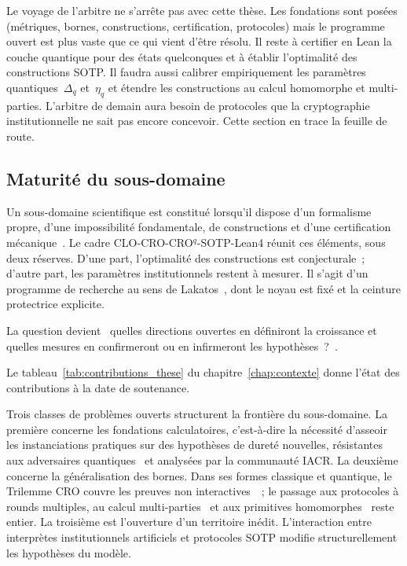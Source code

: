 \begin{boiteArbitre}
Le voyage de l'arbitre ne s'arr\^ete pas avec cette th\`ese. Les fondations
sont pos\'ees (m\'etriques, bornes, constructions, certification,
protocoles) mais le programme ouvert est plus vaste que ce qui vient
d'\^etre r\'esolu. Il reste \`a certifier en Lean la couche quantique pour des \'etats quelconques
et \`a \'etablir l'optimalit\'e des constructions SOTP. Il faudra aussi calibrer empiriquement les param\`etres
quantiques~$\Delta_q$ et~$\eta_q$ et \'etendre les constructions
au calcul homomorphe et multi-parties. L'arbitre de demain
aura besoin de protocoles que la cryptographie institutionnelle ne sait pas
encore concevoir. Cette section en trace la feuille de route.
\end{boiteArbitre}

\subsection{Maturit\'e du sous-domaine}
\label{subsec:maturite_sous_domaine}
\begin{sloppypar}
Un sous-domaine scientifique est constitu\'e lorsqu'il dispose d'un formalisme
propre, d'une impossibilit\'e fondamentale, de constructions et d'une
certification m\'ecanique~\cite{Wiedijk2007,Gonthier08}. Le cadre
CLO-CRO-CRO$^q$-SOTP-Lean4 r\'eunit ces \'el\'ements, sous deux r\'eserves. D'une part,
l'optimalit\'e des constructions est conjecturale~; d'autre part, les param\`etres
institutionnels restent \`a mesurer. Il s'agit d'un programme de recherche au sens
de Lakatos~\cite{Lakatos1978}, dont le noyau est fix\'e et la ceinture
protectrice explicite.

La question devient \guillemotleft~quelles directions ouvertes en
d\'efiniront la croissance et quelles mesures en confirmeront ou en
infirmeront les hypoth\`eses~?~\guillemotright.

Le tableau~\ref{tab:contributions_these} du chapitre~\ref{chap:contexte} donne
l'\'etat des contributions \`a la date de soutenance.

Trois classes de probl\`emes ouverts structurent la fronti\`ere du
sous-domaine. La premi\`ere concerne les fondations calculatoires, c'est-\`a-dire la n\'ecessit\'e
d'asseoir les instanciations pratiques sur des hypoth\`eses de duret\'e
nouvelles, r\'esistantes aux adversaires quantiques~\cite{Bernstein2009,Chen2016}
et analys\'ees par la communaut\'e IACR. La deuxi\`eme concerne la
g\'en\'eralisation des bornes. Dans ses formes classique et
quantique, le Trilemme CRO couvre les preuves non interactives~\cite{Groth16}~; le passage
aux protocoles \`a rounds multiples, au calcul multi-parties~\cite{Evans2018}
et aux primitives homomorphes~\cite{Gentry09} reste entier. La troisi\`eme
est l'ouverture d'un territoire in\'edit. L'interaction entre interpr\`etes
institutionnels artificiels et protocoles SOTP modifie structurellement les
hypoth\`eses du mod\`ele.
\end{sloppypar}

